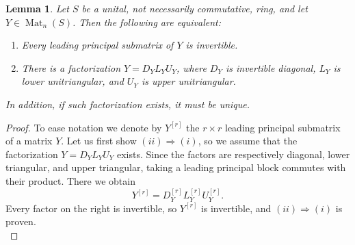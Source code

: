 \documentclass[11pt]{article}
\newtheorem{lemma}[theorem]{Lemma}
\newcommand{\Mat}{\operatorname{Mat}}
\begin{document}
\begin{lemma}\label{lem:LU_decomposition}
Let \(S\) be a unital, not necessarily commutative, ring, and let
\(Y\in\Mat_n(S)\). Then the following are equivalent:
\begin{enumerate}[label=\textup{(\roman*)},leftmargin=2.2em]
\item Every leading principal submatrix of $Y$ is invertible.
\item There is a factorization $Y=D_YL_YU_Y$, where \(D_Y\) is invertible diagonal, \(L_Y\) is lower
unitriangular, and \(U_Y\) is upper unitriangular.
\end{enumerate}
In addition, if such factorization exists, it must be unique.
\end{lemma}

\begin{proof}
To ease notation we denote by $ Y^{[r]}$ the $r\times r$ leading principal submatrix of a matrix $Y$. Let us first show $(ii)\Longrightarrow(i)$, so we assume that the factorization \(Y=D_YL_YU_Y\) exists.  Since the factors are respectively
diagonal, lower triangular, and upper triangular, taking a leading
principal block commutes with their product. There we obtain
\[
 Y^{[r]}=D_Y^{[r]}L_Y^{[r]}U_Y^{[r]}.
\]
Every factor on the right is invertible, so \(Y^{[r]}\) is invertible, and $(ii)\Longrightarrow(i)$ is proven.\\


\end{proof}
\end{document}
